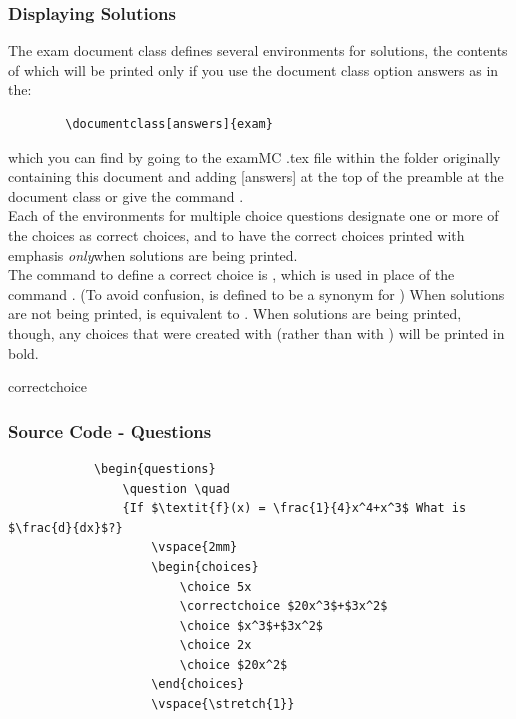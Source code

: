 	\subsubsection{Displaying Solutions}
		The exam document class defines several environments for solutions, the contents of which will be printed only if you use the document class option answers as in the:\\ \begin{verbatim} 
		\documentclass[answers]{exam}
		\end{verbatim}
		which you can find by going to the examMC .tex file within the folder originally containing this document and adding [answers] at the top of the preamble at the document class or give the command .\\ \vspace{1.5mm}
		Each of the environments for multiple choice questions
		designate one or more of the choices as correct choices, and to have the correct choices printed with emphasis \emph{only}when solutions are being printed.\vspace{1.5mm}\\ 
		The command to define a correct choice is , which is used in place of the command . (To avoid confusion,  is defined to be a synonym
		for ) When solutions are not being printed,  is equivalent to . When solutions are being printed, though, any choices that were created with
		 (rather than with ) will be printed in bold.
			\begin{docCommand}{correctchoice}{}
			\end{docCommand}
		\subsubsection{Source Code - Questions}
			\begin{verbatim}
			\begin{questions}
				\question \quad
				{If $\textit{f}(x) = \frac{1}{4}x^4+x^3$ What is $\frac{d}{dx}$?}
					\vspace{2mm}
					\begin{choices}
						\choice 5x
						\correctchoice $20x^3$+$3x^2$
						\choice $x^3$+$3x^2$
						\choice 2x
						\choice $20x^2$
					\end{choices}
					\vspace{\stretch{1}}
			\end{verbatim}
